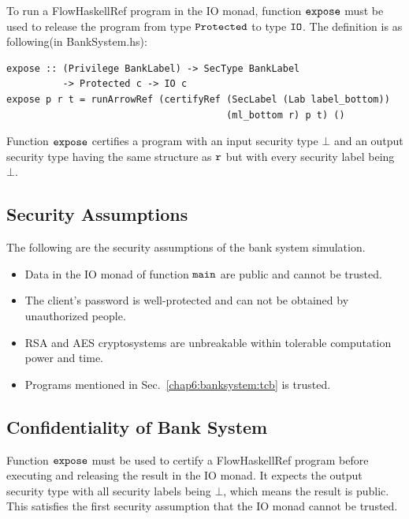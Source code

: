 \documentclass[a4paper]{report}
\newcommand{\co}[1]{$\cod{#1}$}
\begin{document}
To run a FlowHaskellRef program in the IO monad, function \co{expose} must be used to release the program from
type \co{Protected} to type \co{IO}.
The definition is as following(in BankSystem.hs):
\begin{Verbatim}[fontsize=\footnotesize]
expose :: (Privilege BankLabel) -> SecType BankLabel 
          -> Protected c -> IO c
expose p r t = runArrowRef (certifyRef (SecLabel (Lab label_bottom)) 
                                       (ml_bottom r) p t) ()
\end{Verbatim}
Function \co{expose} certifies a program with an input security type $\bot$ and an output security
type having the same structure as \co{r} but with every security label being $\bot$.

\subsection{Security Assumptions}
The following are the security assumptions of the bank system simulation.
\begin{itemize}
\item Data in the IO monad of function \co{main} are public and cannot be trusted.
\item The client's password is well-protected and can not be obtained by unauthorized people.
\item RSA and AES cryptosystems are unbreakable within tolerable computation power and time.
\item Programs mentioned in Sec.~\ref{chap6:banksystem:tcb} is trusted.
\end{itemize}

\subsection{Confidentiality of Bank System}
Function \co{expose} must be used to certify a FlowHaskellRef program before executing and releasing the 
result in the IO monad. It expects the output security
type with all security labels being $\bot$, which means the result is public. This satisfies the first 
security assumption that the IO monad cannot be trusted.
\end{document}
